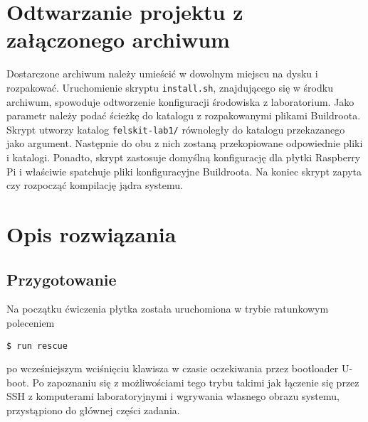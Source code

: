 \documentclass[10pt,a4paper]{article}
\begin{document}
\section{Odtwarzanie projektu z załączonego archiwum}
Dostarczone archiwum należy umieścić w dowolnym miejscu na dysku i rozpakować. Uruchomienie skryptu \texttt{install.sh}, znajdującego się w środku archiwum, spowoduje odtworzenie konfiguracji środowiska z laboratorium. Jako parametr należy podać ścieżkę do katalogu z rozpakowanymi plikami Buildroota.\\[\baselineskip]
Skrypt utworzy katalog \texttt{felskit-lab1/} równoległy do katalogu przekazanego jako argument. Następnie do obu z nich zostaną przekopiowane odpowiednie pliki i katalogi. Ponadto, skrypt zastosuje domyślną konfigurację dla płytki Raspberry Pi i właściwie spatchuje pliki konfiguracyjne Buildroota. Na koniec skrypt zapyta czy rozpocząć kompilację jądra systemu.

\section{Opis rozwiązania}
\subsection{Przygotowanie}
Na początku ćwiczenia płytka została uruchomiona w trybie ratunkowym poleceniem
\begin{lstlisting}[style=bash]
$ run rescue
\end{lstlisting}
po wcześniejszym wciśnięciu klawisza w czasie oczekiwania przez bootloader U-boot. Po zapoznaniu się z możliwościami tego trybu takimi jak łączenie się przez SSH z komputerami laboratoryjnymi i wgrywania własnego obrazu systemu, przystąpiono do głównej części zadania.
\end{document}
